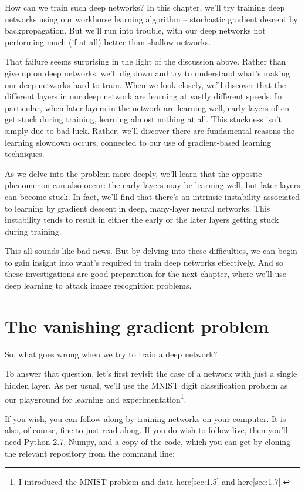 \documentclass[a4paper,twoside,10pt]{book}
\begin{document}
How can we train such deep networks? In this chapter, we'll try training deep networks using our workhorse learning algorithm -- stochastic gradient descent by backpropagation. But we'll run into trouble, with our deep networks not performing much (if at all) better than shallow networks.

That failure seems surprising in the light of the discussion above. Rather than give up on deep networks, we'll dig down and try to understand what's making our deep networks hard to train. When we look closely, we'll discover that the different layers in our deep network are learning at vastly different speeds. In particular, when later layers in the network are learning well, early layers often get stuck during training, learning almost nothing at all. This stuckness isn't simply due to bad luck. Rather, we'll discover there are fundamental reasons the learning slowdown occurs, connected to our use of gradient-based learning techniques.

As we delve into the problem more deeply, we'll learn that the opposite phenomenon can also occur: the early layers may be learning well, but later layers can become stuck. In fact, we'll find that there's an intrinsic instability associated to learning by gradient descent in deep, many-layer neural networks. This instability tends to result in either the early or the later layers getting stuck during training.

This all sounds like bad news. But by delving into these difficulties, we can begin to gain insight into what's required to train deep networks effectively. And so these investigations are good preparation for the next chapter, where we'll use deep learning to attack image recognition problems.

\section{The vanishing gradient problem}
So, what goes wrong when we try to train a deep network?

To answer that question, let's first revisit the case of a network with just a single hidden layer. As per usual, we'll use the MNIST digit classification problem as our playground for learning and experimentation\footnote{I introduced the MNIST problem and data here\ref{sec:1.5} and here\ref{sec:1.7}.}.

If you wish, you can follow along by training networks on your computer. It is also, of course, fine to just read along. If you do wish to follow live, then you'll need Python 2.7, Numpy, and a copy of the code, which you can get by cloning the relevant repository from the command line:
\end{document}
